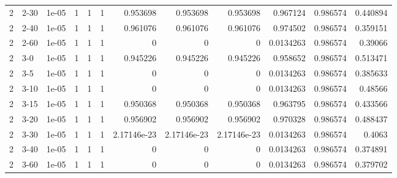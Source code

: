 \begin{tabular}{rlrrrrrrrrrr}
     2 & 2-30   &      1e-05 &           1 &                 1 &                 1 &     0.953698    &     0.953698    &      0.953698    &        0.967124  &               0.986574 &           0.440894 \\
     2 & 2-40   &      1e-05 &           1 &                 1 &                 1 &     0.961076    &     0.961076    &      0.961076    &        0.974502  &               0.986574 &           0.359151 \\
     2 & 2-60   &      1e-05 &           1 &                 1 &                 1 &     0           &     0           &      0           &        0.0134263 &               0.986574 &           0.39066  \\
     2 & 3-0    &      1e-05 &           1 &                 1 &                 1 &     0.945226    &     0.945226    &      0.945226    &        0.958652  &               0.986574 &           0.513471 \\
     2 & 3-5    &      1e-05 &           1 &                 1 &                 1 &     0           &     0           &      0           &        0.0134263 &               0.986574 &           0.385633 \\
     2 & 3-10   &      1e-05 &           1 &                 1 &                 1 &     0           &     0           &      0           &        0.0134263 &               0.986574 &           0.48566  \\
     2 & 3-15   &      1e-05 &           1 &                 1 &                 1 &     0.950368    &     0.950368    &      0.950368    &        0.963795  &               0.986574 &           0.433566 \\
     2 & 3-20   &      1e-05 &           1 &                 1 &                 1 &     0.956902    &     0.956902    &      0.956902    &        0.970328  &               0.986574 &           0.488437 \\
     2 & 3-30   &      1e-05 &           1 &                 1 &                 1 &     2.17146e-23 &     2.17146e-23 &      2.17146e-23 &        0.0134263 &               0.986574 &           0.4063   \\
     2 & 3-40   &      1e-05 &           1 &                 1 &                 1 &     0           &     0           &      0           &        0.0134263 &               0.986574 &           0.374891 \\
     2 & 3-60   &      1e-05 &           1 &                 1 &                 1 &     0           &     0           &      0           &        0.0134263 &               0.986574 &           0.379702 \\

\end{tabular}
